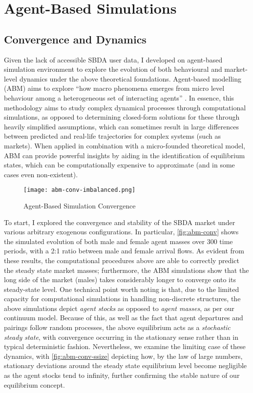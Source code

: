\section{Agent-Based Simulations}
\label{sec:section4}  
\subsection{Convergence and Dynamics}
Given the lack of accessible SBDA user data, I developed on agent-based simulation environment to explore the evolution of both behavioural and market-level dynamics under the above theoretical foundations. Agent-based modelling (ABM) aims to explore ``how macro phenomena emerges from micro level behaviour among a heterogeneous set of interacting agents'' \citep{janssen2005agent}. In essence, this methodology aims to study complex dynamical processes through computational simulations, as opposed to determining closed-form solutions for these through heavily simplified assumptions, which can sometimes result in large differences between predicted and real-life trajectories for complex systems (such as markets).
When applied in combination with a micro-founded theoretical model, ABM can provide powerful insights by aiding in the identification of equilibrium states, which can be computationally expensive to approximate (and in some cases even non-existent).

\begin{figure}[ht]
    \centering
    \caption{Agent-Based Simulation Convergence}
    \texttt{[image: abm-conv-imbalanced.png]}
    \label{fig:abm-conv} 
\end{figure}

To start, I explored the convergence and stability of the SBDA market under various arbitrary exogenous configurations. In particular, \autoref{fig:abm-conv} shows the simulated evolution of both male and female agent masses over 300 time periods, with a 2:1 ratio between male and female arrival flows. As evident from these results, the computational procedures above are able to correctly predict the steady state market masses; furthermore, the ABM simulations show that the long side of the market (males) takes considerably longer to converge onto its steady-state level. One technical point worth noting is that, due to the limited capacity for computational simulations in handling non-discrete structures, the above simulations depict \textit{agent stocks} as opposed to \textit{agent masses}, as per our continuum model. Because of this, as well as the fact that agent departures and pairings follow random processes, the above equilibrium acts as a \textit{stochastic steady state}, with convergence occurring in the stationary sense rather than in typical deterministic fashion. Nevertheless, we examine the limiting case of these dynamics, with \autoref{fig:abm-conv-ssize} depicting how, by the law of large numbers, stationary deviations around the steady state equilibrium level become negligible as the agent stocks tend to infinity, further confirming the stable nature of our equilibrium concept. 

